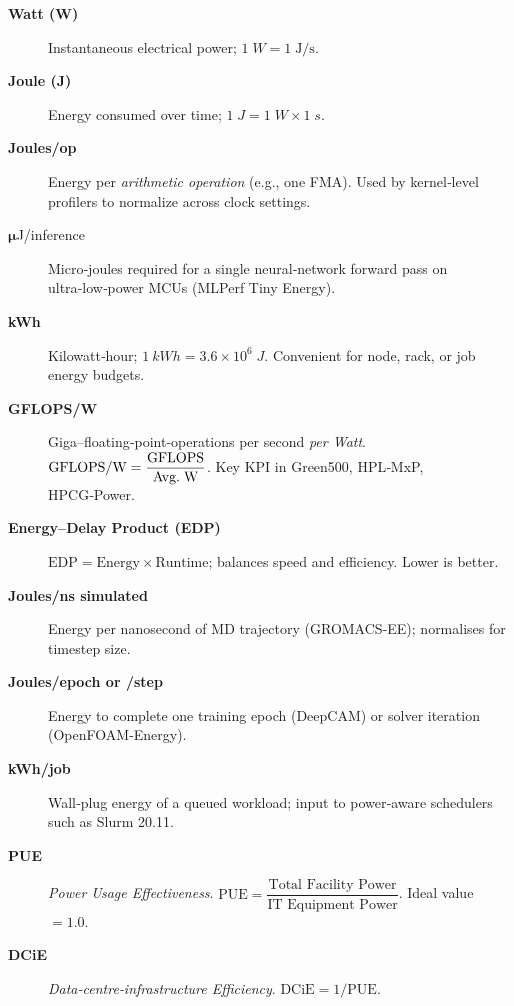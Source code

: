 \begin{description}
\item[\textbf{Watt (W)}] Instantaneous electrical power;
      \(1\;\si{W} = 1\;\si{\joule\per\second}\).

\item[\textbf{Joule (J)}] Energy consumed over time;
      \(1\;\si{J} = 1\;\si{W}\times1\;\si{s}\).

\item[\textbf{Joules/op}] Energy per \emph{arithmetic operation}
      (e.g., one FMA).  Used by kernel‑level profilers to normalize
      across clock settings.

\item[{$\boldsymbol{\mu}$J/inference}] Micro‑joules required for a single
      neural‑network forward pass on ultra‑low‑power MCUs
      (MLPerf Tiny Energy).

\item[\textbf{kWh}] Kilowatt‑hour; \(\SI{1}{kWh}=3.6\times10^{6}\;\si{J}\).
      Convenient for node, rack, or job energy budgets.

\item[\textbf{GFLOPS/W}] Giga–floating‑point‑operations per second
      \emph{per Watt}.  
      \( \text{GFLOPS/W} = \dfrac{\text{GFLOPS}}{\text{Avg.\;W}} \).
      Key KPI in Green500, HPL‑MxP, HPCG‑Power.

\item[\textbf{Energy–Delay Product (EDP)}]
      \( \text{EDP} = \text{Energy}\times\text{Runtime} \); balances
      speed and efficiency.  Lower is better.

\item[\textbf{Joules/ns simulated}] Energy per nanosecond of MD
      trajectory (GROMACS‑EE); normalises for timestep size.

\item[\textbf{Joules/epoch or /step}] Energy to complete one training
      epoch (DeepCAM) or solver iteration (OpenFOAM‑Energy).

\item[\textbf{kWh/job}] Wall‑plug energy of a queued workload; input to
      power‑aware schedulers such as Slurm 20.11.

\item[\textbf{PUE}] \emph{Power Usage Effectiveness}.  
      \(\displaystyle\text{PUE}=
      \dfrac{\text{Total Facility Power}}{\text{IT Equipment Power}}\).
      Ideal value \(=1.0\).

\item[\textbf{DCiE}] \emph{Data‑centre‑infrastructure Efficiency}.
      \( \text{DCiE}=1/\text{PUE} \).


\end{description}
